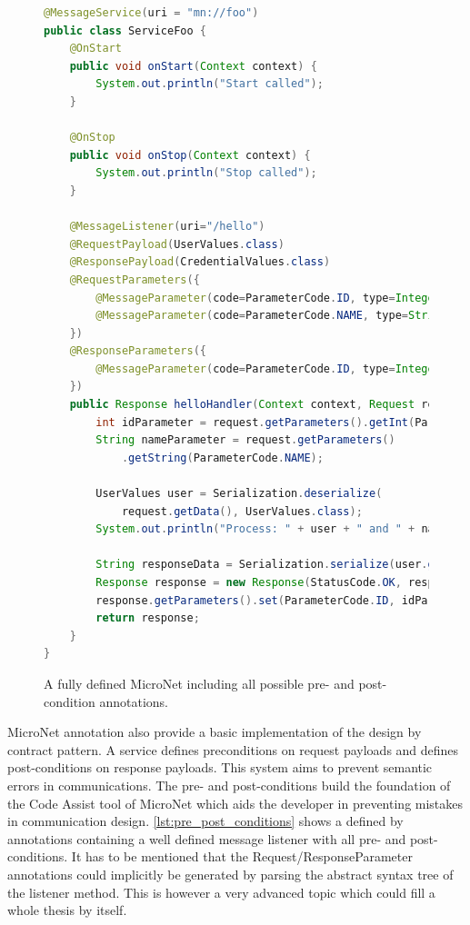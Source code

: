 \begin{figure}
\begin{lstlisting}[language=Java,firstnumber=1] 
@MessageService(uri = "mn://foo")
public class ServiceFoo {
	@OnStart
	public void onStart(Context context) {
		System.out.println("Start called");
	}
	
	@OnStop
	public void onStop(Context context) {
		System.out.println("Stop called");
	}
	
	@MessageListener(uri="/hello")
	@RequestPayload(UserValues.class) 
	@ResponsePayload(CredentialValues.class)
	@RequestParameters({
		@MessageParameter(code=ParameterCode.ID, type=Integer.class),
		@MessageParameter(code=ParameterCode.NAME, type=String.class)
	})
	@ResponseParameters({
		@MessageParameter(code=ParameterCode.ID, type=Integer.class),
	})
	public Response helloHandler(Context context, Request request) {
		int idParameter = request.getParameters().getInt(ParameterCode.ID);
		String nameParameter = request.getParameters()
			.getString(ParameterCode.NAME);
		
		UserValues user = Serialization.deserialize(
			request.getData(), UserValues.class);
		System.out.println("Process: " + user + " and " + nameParameter);

		String responseData = Serialization.serialize(user.getCredentials());
		Response response = new Response(StatusCode.OK, responseData);
		response.getParameters().set(ParameterCode.ID, idParameter);
		return response;
	}
}
\end{lstlisting}
\caption{A fully defined MicroNet \ms{} including all possible pre- and
post-condition annotations.}
\label{lst:pre_post_conditions}
\end{figure}

MicroNet annotation also provide a basic implementation of the design by
contract pattern. A service defines preconditions on request payloads and
defines post-conditions on response payloads. This system aims to prevent
semantic errors in communications. The pre- and post-conditions build the
foundation of the Code Assist tool of MicroNet which aids the developer in
preventing mistakes in \ms{} communication design.
\autoref{lst:pre_post_conditions} shows a \ms{} defined by annotations
containing a well defined message listener with all pre- and post-conditions. It
has to be mentioned that the Request/ResponseParameter annotations could
implicitly be generated by parsing the abstract syntax tree of the listener
method. This is however a very advanced topic which could fill a whole thesis by
itself.
 
